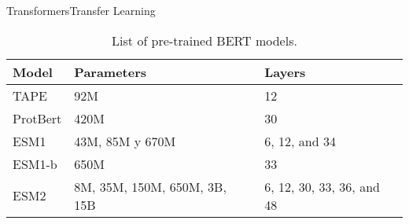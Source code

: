 \documentclass[10pt]{beamer}
\newcommand{\1}{
	\setbeamertemplate{background}{
		\texttt{[image: img/1]}
		\tikz[overlay] \fill[fill opacity=0.75,fill=white] (0,0) rectangle (-\paperwidth,\paperheight);
	}
}
\begin{document}
\begin{frame}{Transformers}{Transfer Learning}
	
	\begin{table}[]
		
		\caption{List of pre-trained BERT models.}
		\setlength{\tabcolsep}{0.8em} %
		{\renewcommand{\arraystretch}{1.1}%
			
		\begin{tabular}{lp{3cm}p{3cm}}
			\textbf{Model} & \textbf{Parameters}          & \textbf{Layers} \\ \hline
			TAPE           & 92M                          & 12                        \\
			ProtBert       & 420M                         & 30                        \\
			ESM1           & 43M, 85M y 670M              & 6, 12, and 34             \\
			ESM1-b         & 650M                         & 33                        \\
			ESM2           & 8M, 35M, 150M, 650M, 3B, 15B & 6, 12, 30, 33, 36, and 48
		\end{tabular}
	
	}
	\end{table}
	
	
\end{frame}
\end{document}
